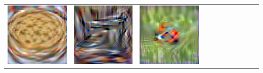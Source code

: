 {\begin{center}
\begin{tabular}{ccccccccccc}
    \includegraphics[align=c,width=\coverwidth\linewidth]{figures/cover/tiny/potpie_0.pdf} &
    \includegraphics[align=c,width=\coverwidth\linewidth]{figures/cover/tiny/sewing_machine_0.pdf} &
    \includegraphics[align=c,width=\coverwidth\linewidth]{figures/cover/tiny/ladybug_0.pdf} &

\end{tabular}
\end{center}}
